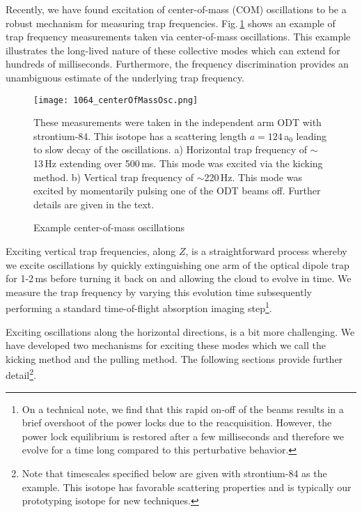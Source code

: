 Recently, we have found excitation of center-of-mass (COM) oscillations to be a robust mechanism for measuring trap frequencies.
Fig.\,\ref{fig:comOscillation} shows an example of trap frequency measurements taken via center-of-mass oscillations.
This example illustrates the long-lived nature of these collective modes which can extend for hundreds of milliseconds.
Furthermore, the frequency discrimination provides an unambiguous estimate of the underlying trap frequency.
	\begin{figure} 
		\centerline{
		\texttt{[image: 1064\_centerOfMassOsc.png]}}
		\caption{Example center-of-mass oscillations}{These measurements were taken in the independent arm ODT with strontium-84. This isotope has a scattering length $a=124$\,a$_0$ leading to slow decay of the oscillations. a) Horizontal trap frequency of $\sim$13\,Hz extending over 500\,ms. This mode was excited via the kicking method. b) Vertical trap frequency of $\sim$220\,Hz. This mode was excited by momentarily pulsing one of the ODT beams off. Further details are given in the text.}
		\label{fig:comOscillation}
	\end{figure}

Exciting vertical trap frequencies, along $Z$, is a straightforward process whereby we excite oscillations by quickly extinguishing one arm of the optical dipole trap for 1-2\,ms before turning it back on and allowing the cloud to evolve in time.
We measure the trap frequency by varying this evolution time subsequently performing a standard time-of-flight absorption imaging step\footnote{On a technical note, we find that this rapid on-off of the beams results in a brief overshoot of the power locks due to the reacquisition.
However, the power lock equilibrium is restored after a few milliseconds and therefore we evolve for a time long compared to this perturbative behavior.}.

Exciting oscillations along the horizontal directions, is a bit more challenging.
We have developed two mechanisms for exciting these modes which we call the kicking method and the pulling method.
The following sections provide further detail\footnote{Note that timescales specified below are given with strontium-84 as the example.
This isotope has favorable scattering properties and is typically our prototyping isotope for new techniques.}.

